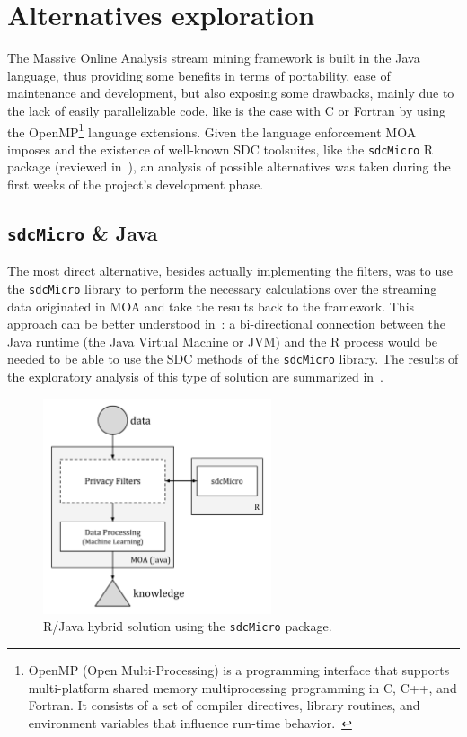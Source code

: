 \section{Alternatives exploration}
\label{Implementation:Alternatives}

The Massive Online Analysis stream mining framework is built in the Java language, thus providing some benefits in terms of portability, ease of maintenance and development, but also exposing some drawbacks, mainly due to the lack of easily parallelizable code, like is the case with C or Fortran by using the OpenMP\footnote{OpenMP (Open Multi-Processing) is a programming interface that supports multi-platform shared memory multiprocessing programming in C, C++, and Fortran. It consists of a set of compiler directives, library routines, and environment variables that influence run-time behavior.~\citep{web:Wiki:OpenMP}} language extensions. Given the language enforcement MOA imposes and the existence of well-known SDC toolsuites, like the \texttt{sdcMicro} R package (reviewed in~), an analysis of possible alternatives was taken during the first weeks of the project's development phase.

\subsection{\texttt{sdcMicro} \& Java}
\label{Implementation:Alternatives:sdcmicro}

The most direct alternative, besides actually implementing the filters, was to use the \texttt{sdcMicro} library to perform the necessary calculations over the streaming data originated in MOA and take the results back to the framework. This approach can be better understood in~: a bi-directional connection between the Java runtime (the Java Virtual Machine or JVM) and the R process would be needed to be able to use the SDC methods of the \texttt{sdcMicro} library. The results of the exploratory analysis of this type of solution are summarized in~.

\begin{figure}[h]
	\centering
	\includegraphics[width=0.6\textwidth]{figures/moa-ppsm-R.pdf}
	\caption{R/Java hybrid solution using the \texttt{sdcMicro} package.}
	\label{fig:ppsm-R}
\end{figure}


